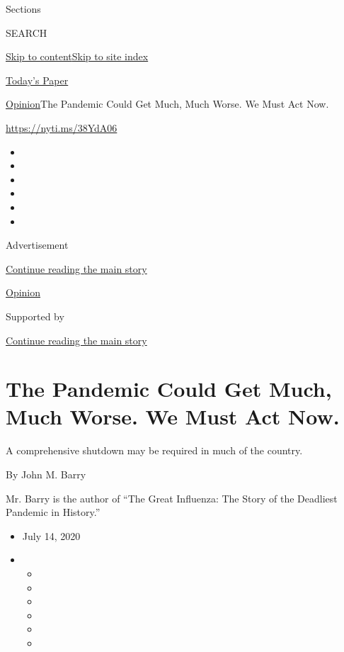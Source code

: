 Sections

SEARCH

\protect\hyperlink{site-content}{Skip to
content}\protect\hyperlink{site-index}{Skip to site index}

\href{https://myaccount.nytimes3xbfgragh.onion/auth/login?response_type=cookie\&client_id=vi}{}

\href{https://www.nytimes3xbfgragh.onion/section/todayspaper}{Today's
Paper}

\href{/section/opinion}{Opinion}\textbar{}The Pandemic Could Get Much,
Much Worse. We Must Act Now.

\url{https://nyti.ms/38YdA06}

\begin{itemize}
\item
\item
\item
\item
\item
\item
\end{itemize}

Advertisement

\protect\hyperlink{after-top}{Continue reading the main story}

\href{/section/opinion}{Opinion}

Supported by

\protect\hyperlink{after-sponsor}{Continue reading the main story}

\hypertarget{the-pandemic-could-get-much-much-worse-we-must-act-now}{%
\section{The Pandemic Could Get Much, Much Worse. We Must Act
Now.}\label{the-pandemic-could-get-much-much-worse-we-must-act-now}}

A comprehensive shutdown may be required in much of the country.

By John M. Barry

Mr. Barry is the author of ``The Great Influenza: The Story of the
Deadliest Pandemic in History.''

\begin{itemize}
\item
  July 14, 2020
\item
  \begin{itemize}
  \item
  \item
  \item
  \item
  \item
  \item
  \end{itemize}
\end{itemize}

